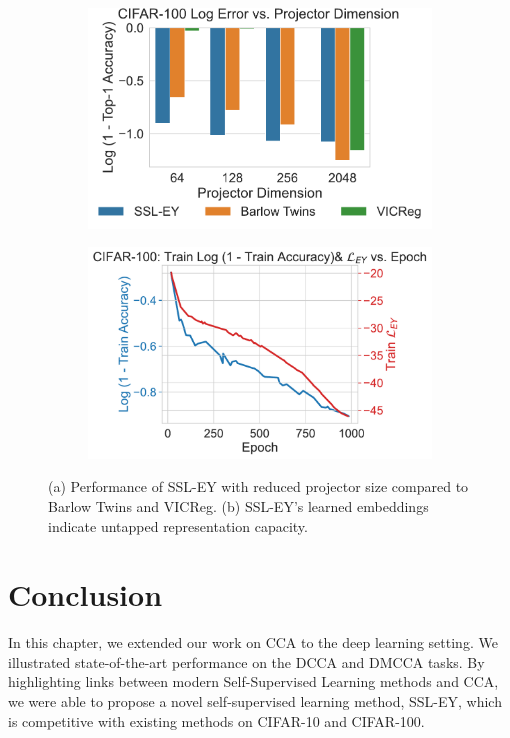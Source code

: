 \begin{figure}[H]
    \begin{subfigure}[b]{0.47\textwidth}
        \centering
        \includegraphics[width=\textwidth]{figures/SSL/cifar100_proj_dim_log_error}
        \caption{}
        \label{fig: ssl projector dimensions 100}
    \end{subfigure}
    \begin{subfigure}[b]{0.47\textwidth}
        \centering
        \includegraphics[width=\textwidth]{figures/SSL/cifar100_corr_vs_acc_log_error}
        \caption{}
        \label{fig:ssl learning curve cifar100 vs corr}
    \end{subfigure}
    \caption{(a) Performance of SSL-EY with reduced projector size compared to Barlow Twins and VICReg. (b) SSL-EY's learned embeddings indicate untapped representation capacity.}
    \label{fig: ssl projector cifar 100}
\end{figure}

\section{Conclusion}

In this chapter, we extended our work on CCA to the deep learning setting.
We illustrated state-of-the-art performance on the DCCA and DMCCA tasks.
By highlighting links between modern Self-Supervised Learning methods and CCA, we were able to propose a novel self-supervised learning method, SSL-EY, which is competitive with existing methods on CIFAR-10 and CIFAR-100.